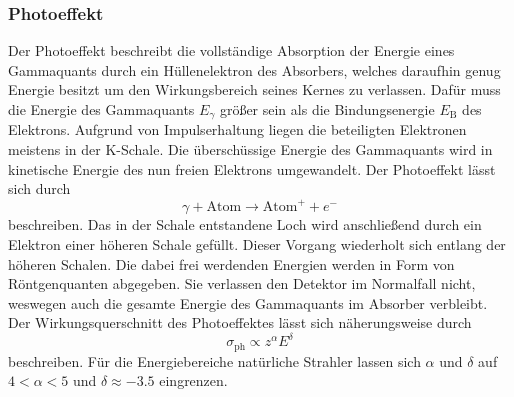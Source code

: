 \subsubsection{Photoeffekt}
Der Photoeffekt beschreibt die vollständige Absorption der Energie eines Gammaquants durch ein Hüllenelektron des Absorbers, welches daraufhin genug Energie besitzt um den Wirkungsbereich seines Kernes zu verlassen. Dafür muss die Energie des Gammaquants $E_\gamma$ größer sein als die Bindungsenergie $E_\text{B}$ des Elektrons. Aufgrund von Impulserhaltung liegen die beteiligten Elektronen meistens in der K-Schale. Die überschüssige Energie des Gammaquants wird in kinetische Energie des nun freien Elektrons umgewandelt. Der Photoeffekt lässt sich durch 
\begin{equation}
    \gamma + \text{Atom} \to \text{Atom}^+ + e^-
\end{equation}
beschreiben. Das in der Schale entstandene Loch wird anschließend durch ein Elektron einer höheren Schale gefüllt. Dieser Vorgang wiederholt sich entlang der höheren Schalen.
Die dabei frei werdenden Energien werden in Form von Röntgenquanten abgegeben. Sie verlassen den Detektor im Normalfall nicht, weswegen auch die gesamte Energie des Gammaquants im Absorber verbleibt.
Der Wirkungsquerschnitt des Photoeffektes lässt sich näherungsweise durch
\begin{equation}
    \sigma_\text{ph} \propto z^\alpha E^\delta
\end{equation}
beschreiben. Für die Energiebereiche natürliche Strahler lassen sich $\alpha$ und $\delta$ auf $4 < \alpha <5 $ und $\delta \approx -3.5$ eingrenzen. 

